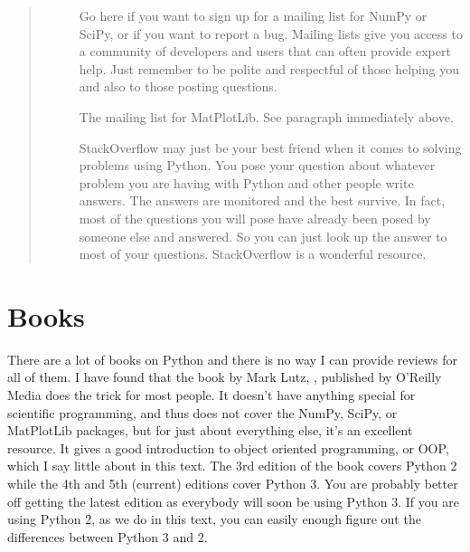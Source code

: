 \documentclass[letterpaper,10pt,english]{sphinxmanual}
\begin{document}
\begin{quote}
\begin{description}
\item[{}] \leavevmode
\sphinxAtStartPar
Go here if you want to sign up for a mailing list for NumPy or SciPy, or if you want to report a bug.  Mailing lists give you access to a community of developers and users that can often provide expert help.  Just remember to be polite and respectful of those helping you and also to those posting questions.

\item[{}] \leavevmode
\sphinxAtStartPar
The mailing list for MatPlotLib.  See paragraph immediately above.

\item[{}] \leavevmode
\sphinxAtStartPar
StackOverflow may just be your best friend when it comes to solving problems using Python.  You pose your question about whatever problem you are having with Python and other people write answers.  The answers are monitored and the best survive.  In fact, most of the questions you will pose have already been posed by someone else and answered.  So you can just look up the answer to most of your questions.  StackOverflow is a wonderful resource.

\end{description}
\end{quote}


\section{Books}
\label{\detokenize{apdx3/apdx3_resources:books}}
\sphinxAtStartPar
There are a lot of books on Python and there is no way I can provide reviews for all of them.  I have found that the book by Mark Lutz, , published by O’Reilly Media does the trick for most people.  It doesn’t have anything special for scientific programming, and thus does not cover the NumPy, SciPy, or MatPlotLib packages, but for just about everything else, it’s an excellent resource.  It gives a good introduction to object oriented programming, or OOP, which I say little about in this text.  The 3rd edition of the book covers Python 2 while the 4th and 5th (current) editions cover Python 3.  You are probably better off getting the latest edition as everybody will soon be using Python 3.  If you are using Python 2, as we do in this text, you can easily enough figure out the differences between Python 3 and 2.



\renewcommand{\indexname}{Index}
\printindex
\end{document}

